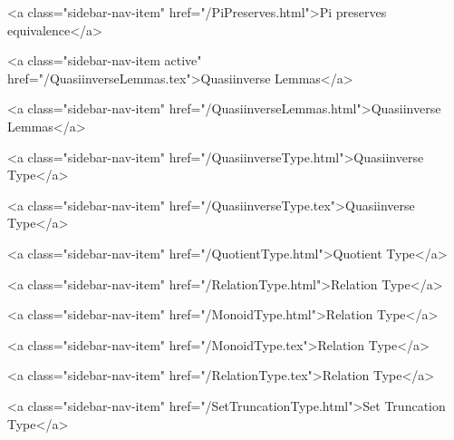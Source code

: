           <a class="sidebar-nav-item" href="/PiPreserves.html">Pi preserves equivalence</a>
        
      
    
      
        
          <a class="sidebar-nav-item active" href="/QuasiinverseLemmas.tex">Quasiinverse Lemmas</a>
        
      
    
      
        
          <a class="sidebar-nav-item" href="/QuasiinverseLemmas.html">Quasiinverse Lemmas</a>
        
      
    
      
        
          <a class="sidebar-nav-item" href="/QuasiinverseType.html">Quasiinverse Type</a>
        
      
    
      
        
          <a class="sidebar-nav-item" href="/QuasiinverseType.tex">Quasiinverse Type</a>
        
      
    
      
        
          <a class="sidebar-nav-item" href="/QuotientType.html">Quotient Type</a>
        
      
    
      
        
          <a class="sidebar-nav-item" href="/RelationType.html">Relation Type</a>
        
      
    
      
        
          <a class="sidebar-nav-item" href="/MonoidType.html">Relation Type</a>
        
      
    
      
        
          <a class="sidebar-nav-item" href="/MonoidType.tex">Relation Type</a>
        
      
    
      
        
          <a class="sidebar-nav-item" href="/RelationType.tex">Relation Type</a>
        
      
    
      
        
          <a class="sidebar-nav-item" href="/SetTruncationType.html">Set Truncation Type</a>
        
      
    

